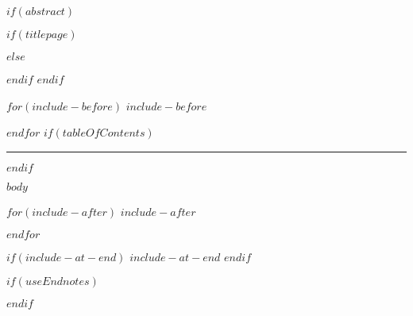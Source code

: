 \documentclass[$if(fontSize)$$fontSize$,%
	$if(language)$$language$,$else$english,$endif$%
	$if(paperSize)$$paperSize$,$else$ a4paper,%
	$endif$$if(classOptions)$$classOptions$,$endif$%
	$if(twoSided)$twosided,$endif$%
	$if(titlepage)$titlepage,$endif$%
	$if(centerEqs)$$else$fleqn$endif$]{$if(documentClass)$%
		$documentClass$$else$article$endif$}
\begin{document}
\renewcommand\abstractname{\sffamily Abstract}

$if(abstract)$




$if(titlepage)$
	\begin{abstract}
		$abstract$
	\end{abstract}
$else$
\setlength{\absparindent}{0.51em}


	\begin{abstract}
	\begin{abstractBox} %
		$abstract$
	\end{abstractBox}
	\end{abstract}


$endif$
$endif$

$for(include-before)$
$include-before$

$endfor$
$if(tableOfContents)$
{
\hypersetup{linkcolor=black}
\setcounter{tocdepth}{$toc-depth$}
\tableofcontents
}

\noindent\rule{\linewidth}{0.05em}
$endif$

$body$

$for(include-after)$
$include-after$

$endfor$

$if(include-at-end)$
$include-at-end$
$endif$


$if(useEndnotes)$
\renewcommand{\notesname}{~}



\def\enotesize{\normalsize}
\theendnotes
$endif$
\end{document}

